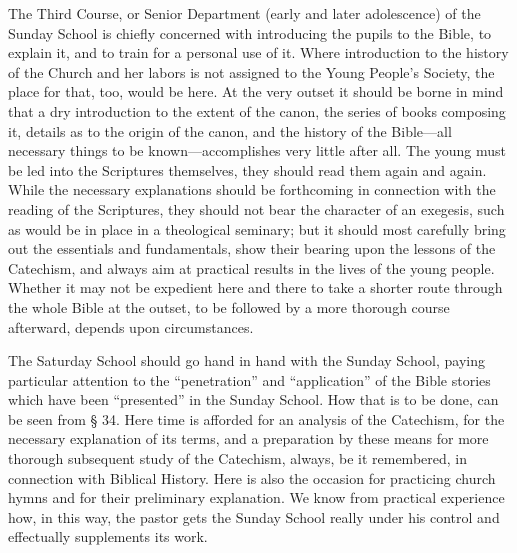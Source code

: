 The Third Course, or Senior Department (early and later adolescence) of the Sunday School is chiefly concerned with introducing the pupils to the Bible, to explain it, and to train for a personal use of it. Where introduction to the history of the Church and her labors is not assigned to the Young
People’s Society, the place for that, too, would be here. At the very outset it should be borne in mind that a dry introduction to the extent of the canon, the series of books composing it, details as to the origin of the canon, and the history of the Bible—all necessary things to be known—accomplishes very little after all. The young must be led into the Scriptures themselves, they should read them again and again. While the necessary explanations should be forthcoming in connection with the reading of the Scriptures, they should not bear the character of an exegesis, such as would be in place in a theological seminary; but it should most carefully bring out the essentials and fundamentals, show their bearing upon the lessons of the Catechism, and always aim at practical results in the lives of the young people. Whether it may not be expedient here and there to take a shorter route through the whole Bible at the outset, to be followed by a more thorough course afterward, depends upon circumstances.

The Saturday School should go hand in hand with the Sunday School, paying particular attention to the “penetration” and “application” of the Bible stories which have been “presented” in the Sunday School. How that is to be done, can be seen from § 34. Here time is afforded for an analysis of the Catechism, for the necessary explanation of its terms, and a preparation by these means for more thorough subsequent study of the Catechism, always, be it remembered, in connection with Biblical History. Here is also the occasion for practicing church hymns and for their preliminary explanation. We know from practical experience how, in this way, the pastor gets the Sunday School really under his control and effectually supplements its work.

